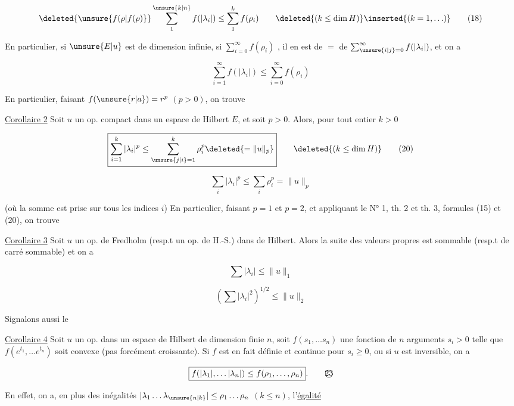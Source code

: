 
\[
\deleted{\unsure{f(\rho|f(\rho)}}\sum_1^{\unsure{k|n}}f(|\lambda_i|)\leq\sum_1^k f(\rho_i)\qquad\deleted{(k\leq\dim H)}\inserted{(k=1,\ldots)}\tag*{(18)}
\]

En particulier,  si \deleted{\unsure{$\dim$}} $\unsure{E|u}$ est de dimension infinie, si  $\sum_{i=0}^{\infty}f(\rho_i)$ , il en est de $=$ de $\sum_{\unsure{i|j}=0}^{\infty}f(|\lambda_i|)$, et on a

\[
\sum_{i=1}^{\infty}f(|\lambda_i|)\leq\sum_{i=0}^{\infty}f(\rho_i)\tag*{(19)}
\]

En particulier, faisant $f(\unsure{r|a})=r^p$ $(p>0)$, on trouve

\uline{Corollaire 2} Soit $u$ un op. compact dans un espace de Hilbert $E$, et soit $p>0$. Alors, pour tout entier $k>0$

\[
\boxed{\sum_{i=1}^k|\lambda_i|^p\leq\sum_{\unsure{j|i}=1}^k\rho_i^p\deleted{=\|u\|_p}}\qquad\deleted{(k\leq\dim H)}\tag*{(20)}
\]


\[
\boxed{\sum_i|\lambda_i|^p\leq\sum_i\rho_i^p=\|u\|_p}\tag*{(21)}
\]

(où la somme est prise sur tous les indices $i$) En particulier, faisant $p=1$ et $p=2$, et appliquant le N° 1, th. 2 et th. 3, formules (15) et (20), on trouve

\uline{Corollaire 3} Soit $u$ un op.  de Fredholm (resp.t un op. de  H.-S.) dans  de Hilbert.  Alors  la suite des valeurs propres est sommable (resp.t de carré sommable) et on a

\[
\boxed{\sum|\lambda_i|\leq\|u\|_1}\tag*{(21)}
\]

\[
\boxed{\left(\sum|\lambda_i|^2\right)^{1/2}\leq\|u\|_2}\tag*{(22)}
\]

Signalons aussi le


\uline{Corollaire 4} Soit $u$ un op.  dans un espace de Hilbert de dimension finie $n$,  soit $f(s_1,\ldots s_n)$  une fonction de $n$ arguments $s_i>0$ telle que $f(e^{t_1},\ldots e^{t_n})$ soit convexe (pas forcément croissante). Si $f$ est en fait définie et continue pour  $s_i\geq0$, ou si $u$ est inversible, on a

\[
\boxed{f(|\lambda_1|,\ldots|\lambda_n|)\leq f(\rho_1,\ldots,\rho_n)}.\tag*{\textcircled{23}}
\]

 En effet, on a, en plus des inégalités $|\lambda_1\ldots\lambda_{\unsure{n|k}}|\leq\rho_1\ldots\rho_n$ $(k\leq n)$, l'\uline{égalité}

